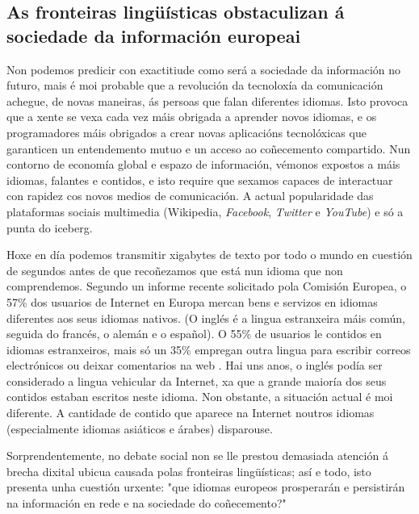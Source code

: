 \begin{multicols}{2}
\subsection{As fronteiras lingüísticas obstaculizan á sociedade da  información europeai}
  
 Non podemos predicir con exactitiude como será a sociedade da información no futuro, mais é moi probable que a revolución da tecnoloxía da comunicación achegue, de novas maneiras, ás persoas que falan diferentes idiomas. Isto provoca que a xente se vexa cada vez máis obrigada a aprender novos idiomas, e os programadores máis obrigados a crear novas aplicacións tecnolóxicas que garanticen un entendemento mutuo e un acceso ao coñecemento compartido. Nun contorno de economía global e espazo de información, vémonos expostos a máis idiomas, falantes e contidos, e isto require que sexamos capaces de interactuar con rapidez cos novos medios de comunicación. A actual popularidade das plataformas sociais multimedia (Wikipedia,  \textit{Facebook}, \textit{Twitter}  e \textit{YouTube}) e só a punta do iceberg.




Hoxe en día podemos transmitir xigabytes de texto por todo o mundo en cuestión de segundos antes de que recoñezamos que está nun idioma que non comprendemos. Segundo un informe recente solicitado pola Comisión Europea, o 57\% dos usuarios de Internet en Europa mercan bens e servizos en idiomas diferentes aos seus idiomas nativos. (O inglés é a lingua estranxeira máis común, seguida do francés, o alemán e o español). O 55\% de usuarios le contidos en idiomas estranxeiros, mais só un 35\% empregan outra lingua para escribir correos electrónicos ou deixar comentarios na web \cite{GAL-Nota1}.  Hai uns anos, o inglés podía ser considerado a lingua vehicular da Internet, xa que a grande maioría dos seus contidos estaban escritos neste idioma. Non obstante, a situación actual é moi diferente. A cantidade de contido que aparece na Internet noutros idiomas (especialmente idiomas asiáticos e árabes) disparouse.

Sorprendentemente, no debate social non se lle prestou demasiada atención á brecha dixital ubicua causada polas fronteiras lingüísticas; así e todo, isto presenta unha cuestión urxente: "que idiomas europeos prosperarán e persistirán na información en rede e na sociedade do coñecemento?"


\end{multicols}
